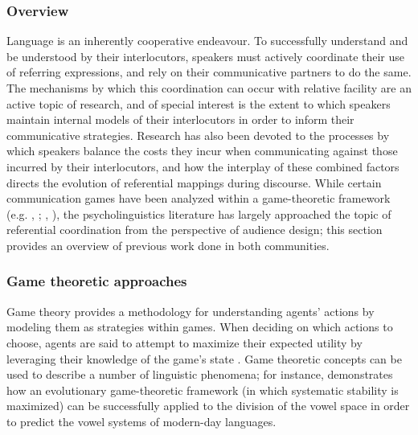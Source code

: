 \documentclass[11pt]{article}
\begin{document}
\subsubsection{Overview}
Language is an inherently cooperative endeavour. To successfully understand and be understood by their interlocutors, speakers must actively coordinate their use of referring expressions, and rely on their communicative partners to do the same. The mechanisms by which this coordination can occur with relative facility are an active topic of research, and of special interest is the extent to which speakers maintain internal models of their interlocutors in order to inform their communicative strategies. Research has also been devoted to the processes by which speakers balance the costs they incur when communicating against those incurred by their interlocutors, and how the interplay of these combined factors directs the evolution of referential mappings during discourse. While certain communication games have been analyzed within a game-theoretic framework (e.g. \citeauthor{rohde2012}, \citeyear{rohde2012}; \citeauthor{degen2012}, \citeyear{degen2012}), the psycholinguistics literature has largely approached the topic of referential coordination from the perspective of audience design; this section provides an overview of previous work done in both communities.

\subsubsection{Game theoretic approaches}
Game theory provides a methodology for understanding agents' actions by modeling them as strategies within games. When deciding on which actions to choose, agents are said to attempt to maximize their expected utility by leveraging their knowledge of the game's state \citep{benz2005}. Game theoretic concepts can be used to describe a number of linguistic phenomena; for instance, \cite{jaeger2008} demonstrates how an evolutionary game-theoretic framework (in which systematic stability is maximized) can be successfully applied to the division of the vowel space in order to predict the vowel systems of modern-day languages.
\end{document}

